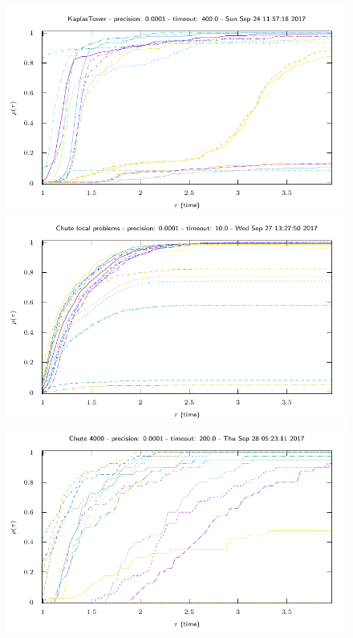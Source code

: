 \begin{figure}
  \includegraphics[width=\figwidth]{../figure/NSGS/LocalSolver/1.0e-04/400/time/profile-KaplasTower.pdf} 
  \includegraphics[width=\figwidth]{../figure/NSGS/LocalSolver/1.0e-04/10/time/profile-Chute_local_problems.pdf} 
  \includegraphics[width=\figwidth]{../figure/NSGS/LocalSolver/1.0e-04/200/time/profile-Chute_4000.pdf} 

\end{figure}
